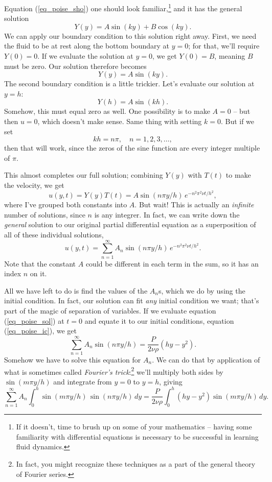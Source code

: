 Equation (\ref{eq_poise_sho}) one should look familiar,\footnote{If it doesn't, time to brush up on some of your mathematics -- having some familiarity with differential equations is necessary to be successful in learning fluid dynamics.} and it has the general solution
\[
Y(y) = A \sin (ky) + B \cos (ky).
\]
We can apply our boundary condition to this solution right away.  First, we need the fluid to be at rest along the bottom boundary at $y=0$; for that, we'll require $Y(0) = 0$.  If we evaluate the solution at $y=0$, we get $Y(0) = B$, meaning $B$ must be zero.  Our solution therefore becomes
\[
Y(y) = A \sin (ky).
\]
The second boundary condition is a little trickier.  Let's evaluate our solution at $y = h$:
\[
Y(h) = A \sin(kh).
\]
Somehow, this must equal zero as well.  One possibility is to make $A = 0$ -- but then $u = 0$, which doesn't make sense.  Same thing with setting $k = 0$.  But if we set 
\[
kh = n\pi, \quad n = 1, 2, 3, \dots,
\]
then that will work, since the zeros of the sine function are every integer multiple of $\pi$.

This almost completes our full solution; combining $Y(y)$ with $T(t)$ to make the velocity, we get
\[
u(y, t) = Y(y)T(t) = A \sin (n\pi y / h) \, e^{-n^2 \pi^2 \nu t / h^2},
\]
where I've grouped both constants into $A$.  But wait!  This is actually an \emph{infinite} number of solutions, since $n$ is any integrer.  In fact, we can write down the \emph{general} solution to our original partial differential equation as a superposition of all of these individual solutions,
\begin{equation}
\label{eq_poise_sol}
u(y, t) = \sum_{n=1}^\infty A_n \sin(n \pi y / h) \, e^{-n^2 \pi^2 \nu t / h^2}.
\end{equation}
Note that the constant $A$ could be different in each term in the sum, so it has an index $n$ on it.

All we have left to do is find the values of the $A_n$s, which we do by using the initial condition.  In fact, our solution can fit \emph{any} initial condition we want; that's part of the magic of separation of variables.  If we evaluate equation (\ref{eq_poise_sol}) at $t=0$ and equate it to our initial conditions, equation (\ref{eq_poise_ic}), we get
\[
\sum_{n=1}^\infty A_n \sin(n \pi y / h) =  \frac{P}{2\nu \rho} (hy - y^2).
\]
Somehow we have to solve this equation for $A_n$.  We can do that by application of what is sometimes called \emph{Fourier's trick}:\footnote{In fact, you might recognize these techniques as a part of the general theory of Fourier series.} we'll multiply both sides by $\sin(m \pi y/h)$ and integrate from $y=0$ to $y=h$, giving
\begin{equation}
\label{eq_poise_coeff}
\sum_{n=1}^\infty A_n \int_0^h \sin(m\pi y/h) \, \sin(n \pi y / h) \, dy =  \frac{P}{2\nu \rho} \int_0^h (hy - y^2)\sin(m\pi y/h) \, dy.
\end{equation}

